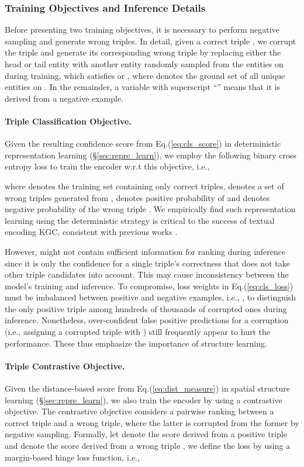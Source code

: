\documentclass[sigconf]{acmart}
\begin{document}
\subsubsection{Training Objectives and Inference Details} \label{subsubsec:train_infer_details}

Before presenting two training objectives, it is necessary to perform negative sampling and generate wrong triples. In detail, given a correct triple , we corrupt the triple and generate its corresponding wrong triple  by replacing either the head or tail entity with another entity randomly sampled from the entities  on  during training, which satisfies  or , where  denotes the ground set of all unique entities on . In the remainder, a variable with superscript ``'' means that it is derived from a negative example. 

\paragraph{Triple Classification Objective.} 
Given the resulting confidence score  from Eq.(\ref{eq:cls_score}) in deterministic representation learning (\S\ref{sec:repre_learn}), we employ the following binary cross entropy loss to train the encoder w.r.t this objective, i.e., 

where  denotes the training set containing only correct triples,  denotes a set of wrong triples generated from , 
 denotes positive probability of  and  denotes negative probability of the wrong triple . 
We empirically find such representation learning using the deterministic strategy is critical to the success of textual encoding KGC, consistent with previous works \cite{yao2019kgbert,reimers2019sentbert}. 

However,  might not contain sufficient information for ranking during inference since it is only the confidence for a single triple's correctness that does not take other triple candidates into account. This may cause inconsistency between the model's training and inference. 
To compromise, loss weights in Eq.(\ref{eq:cls_loss}) must be imbalanced between positive and negative examples, i.e., , to distinguish the only positive triple among hundreds of thousands of corrupted ones during inference. 
Nonetheless, over-confident false positive predictions for a corruption (i.e., assigning a corrupted triple with ) still frequently appear to hurt the performance. These thus emphasize the importance of structure learning. 

\paragraph{Triple Contrastive Objective.} 
Given the distance-based score  from Eq.(\ref{eq:dist_measure}) in spatial structure learning (\S\ref{sec:repre_learn}), we also train the encoder by using a contrastive objective. 
The contrastive objective considers a pairwise ranking between a correct triple and a wrong triple, where the latter is corrupted from the former by negative sampling. 
Formally, let  denote the score derived from a positive triple  and  denote the score derived from a wrong triple , we define the loss by using a margin-based hinge loss function, i.e., 
\end{document}
